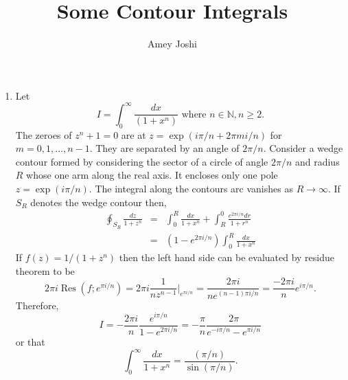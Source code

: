 \documentclass{article}
\DeclareMathOperator{\res}{Res}
\begin{document}
\title{Some Contour Integrals}
\author{Amey Joshi}
\maketitle
\begin{enumerate}
\item Let
\begin{equation}\label{e1}
I = \int_0^\infty \frac{dx}{(1 + x^n)} \text{ where } n \in \mathbb{N}, n \ge 2.
\end{equation}
The zeroes of $z^n + 1 = 0$ are at $z = \exp(i\pi/n + 2\pi m i/n)$ for $m = 0,
1, \ldots, n - 1$. They are separated by an angle of $2\pi/n$. Consider a wedge
contour formed by considering the sector of a circle of angle $2\pi/n$ and 
radius $R$ whose one arm along the real axis. It encloses only one pole $z = 
\exp(i\pi/n)$. The integral along the contours arc vanishes as $R \rightarrow
\infty$. If $S_R$ denotes the wedge contour then,
\begin{eqnarray*}
\oint_{S_R}\frac{dz}{1 + z^n} &=& \int_0^R\frac{dx}{1 + x^n} + 
\int_R^0\frac{e^{2\pi i/n}dr}{1 + r^n} \\
&=& (1 - e^{2\pi i/n})\int_0^R\frac{dx}{1 + x^n}
\end{eqnarray*}
If $f(z) = 1/(1 + z^n)$ then the left hand side can be evaluated by residue
theorem to be
\[
2\pi i\res(f; e^{\pi i/n}) = 2\pi i\frac{1}{nz^{n-1}}\Big|_{e^{\pi i/n}}
= \frac{2\pi i}{ne^{(n-1)\pi i/n}} = \frac{-2\pi i}{n}e^{i\pi/n}.
\]
Therefore,
\[
I = -\frac{2\pi i}{n}\frac{e^{i\pi/n}}{1 - e^{2\pi i/n}} = 
-\frac{\pi}{n}\frac{2\pi}{e^{-i\pi/n} - e^{\pi i/n}}
\]
or that
\begin{equation}\label{e2}
\int_0^\infty \frac{dx}{1 + x^n} = \frac{(\pi/n)}{\sin(\pi/n)}.
\end{equation}
\end{enumerate}
\end{document}
